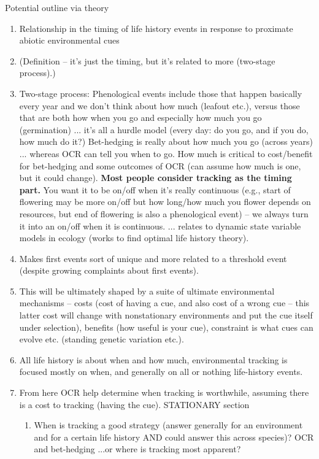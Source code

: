 \documentclass[11pt,letterpaper]{article}
\begin{document}
Potential outline via theory
\begin{enumerate}
\item Relationship in the timing of life history events in response to proximate abiotic environmental cues 
\item (Definition -- it's just the timing, but it's related to more (two-stage process).)
\item Two-stage process: Phenological events include those that happen basically every year and we don't think about how much (leafout etc.), versus those that are both how when you go and especially how much you go (germination) ... it's all a hurdle model (every day: do you go, and if you do, how much do it?) Bet-hedging is really about how much you go (across years) ... whereas OCR can tell you when to go. How much is critical to cost/benefit for bet-hedging and some outcomes of OCR (can assume how much is one, but it could change). {\bf Most people consider tracking as the timing part.} You want it to be on/off when it's really continuous (e.g., start of flowering may be more on/off but how long/how much you flower depends on resources, but end of flowering is also a phenological event) -- we always turn it into an on/off when it is continuous. ... relates to dynamic state variable models in ecology (works to find optimal life history theory). 
\item Makes first events sort of unique and more related to a threshold event (despite growing complaints about first events).
\item This will be ultimately shaped by a suite of ultimate environmental mechanisms -- costs (cost of having a cue, and also cost of a wrong cue -- this latter cost will change with nonstationary environments and put the cue itself under selection), benefits (how useful is your cue), constraint is what cues can evolve etc. (standing genetic variation etc.). 
\item All life history is about when and how much, environmental tracking is focused mostly on when, and generally on all or nothing life-history events. 
\item From here OCR help determine when tracking is worthwhile, assuming there is a cost to tracking (having the cue). STATIONARY section
\begin{enumerate}
\item When is tracking a good strategy (answer generally for an environment and for a certain life history AND could answer this across species)? OCR and bet-hedging ...or where is tracking most apparent?

\end{enumerate}
\end{enumerate}
\end{document}
